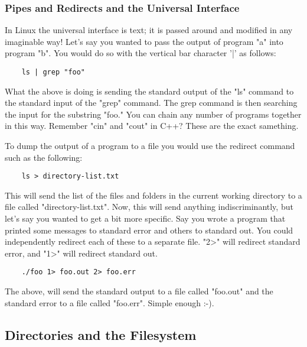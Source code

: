 \subsubsection{Pipes and Redirects and the Universal Interface} \mdseries 
In Linux the universal interface is text; it is passed around and modified in any imaginable way!  Let's say you wanted to pass the output of program "a" into program "b".  You would do so with the vertical bar character '|' as follows:
	
	\begin{verbatim}
	ls | grep "foo"
	\end{verbatim}
	
What the above is doing is sending the standard output of the "ls" command to the standard input of the "grep" command.  The grep command is then searching the input for the substring "foo."  You can chain any number of programs together in this way.  Remember "cin" and "cout" in C++? These are the exact samething.

To dump the output of a program to a file you would use the redirect command such as the following:

	\begin{verbatim}
	ls > directory-list.txt
	\end{verbatim}
	
This will send the list of the files and folders in the current working directory to a file called "directory-list.txt".  Now, this will send anything indiscriminantly, but let's say you wanted to get a bit more specific.  Say you wrote a program that printed some messages to standard error and others to standard out.  You could independently redirect each of these to a separate file.  "2>" will redirect standard error, and "1>" will redirect standard out.

	\begin{verbatim}
	./foo 1> foo.out 2> foo.err
	\end{verbatim}
	
The above, will send the standard output to a file called "foo.out" and the standard error to a file called "foo.err".  Simple enough :-).

	
\subsection{Directories and the Filesystem} \mdseries 
